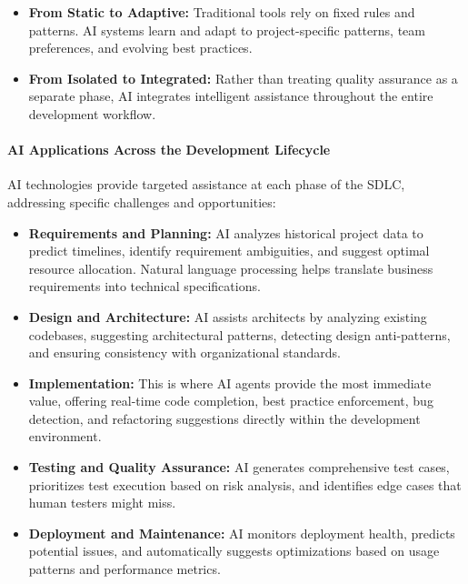 \begin{spacing}{1.2}
\begin{itemize}
    \item \textbf{From Static to Adaptive:} Traditional tools rely on fixed rules and patterns. AI systems learn and adapt to project-specific patterns, team preferences, and evolving best practices.
    
    \item \textbf{From Isolated to Integrated:} Rather than treating quality assurance as a separate phase, AI integrates intelligent assistance throughout the entire development workflow.
\end{itemize}

\paragraph{AI Applications Across the Development Lifecycle}

AI technologies provide targeted assistance at each phase of the SDLC, addressing specific challenges and opportunities:

\begin{itemize}
    \item \textbf{Requirements and Planning:} AI analyzes historical project data to predict timelines, identify requirement ambiguities, and suggest optimal resource allocation. Natural language processing helps translate business requirements into technical specifications.
    
    \item \textbf{Design and Architecture:} AI assists architects by analyzing existing codebases, suggesting architectural patterns, detecting design anti-patterns, and ensuring consistency with organizational standards.
    
    \item \textbf{Implementation:} This is where AI agents provide the most immediate value, offering real-time code completion, best practice enforcement, bug detection, and refactoring suggestions directly within the development environment.
    
    \item \textbf{Testing and Quality Assurance:} AI generates comprehensive test cases, prioritizes test execution based on risk analysis, and identifies edge cases that human testers might miss.
    
    \item \textbf{Deployment and Maintenance:} AI monitors deployment health, predicts potential issues, and automatically suggests optimizations based on usage patterns and performance metrics.
\end{itemize}


\end{spacing}
